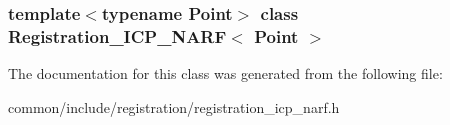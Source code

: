 \subsubsection*{template$<$typename Point$>$ class Registration\_\-ICP\_\-NARF$<$ Point $>$}



The documentation for this class was generated from the following file:\begin{DoxyCompactItemize}
\item 
common/include/registration/registration\_\-icp\_\-narf.h\end{DoxyCompactItemize}

